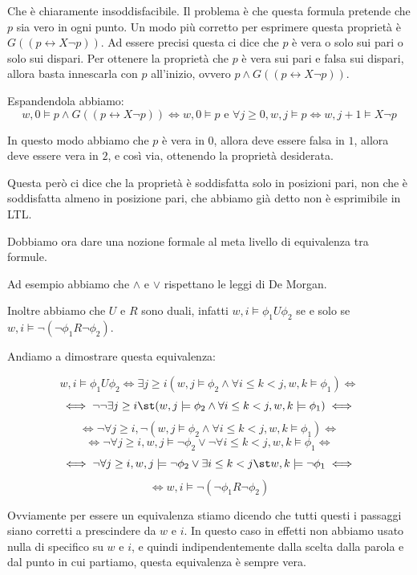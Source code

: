 Che è chiaramente insoddisfacibile. Il problema è che questa formula pretende che \(p\) sia vero in ogni punto.
Un modo più corretto per esprimere questa proprietà è \(G((p \leftrightarrow X \neg p) )\). Ad essere precisi questa ci dice che \(p\) è vera o solo sui pari o solo sui dispari. Per ottenere la proprietà che \(p\) è vera sui pari e falsa sui dispari, allora basta innescarla con \(p\) all'inizio, ovvero \(p \land G((p \leftrightarrow X \neg p) )\).

Espandendola abbiamo:
\[w,0 \models p \land G((p \leftrightarrow X \neg p) )\iff w,0 \models p \text{ e } \forall j \geq 0, w,j \models p \iff w,j+1 \models X \neg p\]

In questo modo abbiamo che \(p\) è vera in \(0\), allora deve essere falsa in \(1\), allora deve essere vera in \(2\), e così via, ottenendo la proprietà desiderata.

Questa però ci dice che la proprietà è soddisfatta solo in posizioni pari, non che è soddisfatta almeno in posizione pari, che abbiamo già detto non è esprimibile in LTL\@.

Dobbiamo ora dare una nozione formale al meta livello di equivalenza tra formule.

Ad esempio abbiamo che \(\land\) e \(\lor\) rispettano le leggi di De Morgan.

Inoltre abbiamo che \(U\) e \(R\) sono duali, infatti \(w,i \models \phi_1 U \phi_2\) se e solo se \(w,i \models \neg (\neg \phi_1 R \neg \phi_2)\).

Andiamo a dimostrare questa equivalenza:

\[w,i\models \phi_1 U \phi_2 \iff \exists j \geq i( w,j \models \phi_2 \land \forall i\leq k < j, w,k\models \phi_1)\iff\]
\[\iff \neg \neg \exists j \geq i\st( w,j \models \phi_2 \land \forall i\leq k < j, w,k\models \phi_1) \iff\]
\[\iff \neg \forall j \geq i,\neg( w,j \models \phi_2 \land \forall i\leq k < j, w,k\models \phi_1) \iff\]
\[\iff \neg \forall j \geq i, w,j \models \neg \phi_2 \lor \neg \forall i\leq k < j, w,k\models \phi_1 \iff\]
\[\iff \neg \forall j \geq i, w,j \models \neg \phi_2 \lor \exists i \leq k < j\st w,k\models \neg \phi_1 \iff\]
\[\iff w,i \models \neg (\neg \phi_1 R \neg \phi_2)\]

Ovviamente per essere un equivalenza stiamo dicendo che tutti questi i passaggi siano corretti a prescindere da \(w\) e \(i\).
In questo caso in effetti non abbiamo usato nulla di specifico su \(w\) e \(i\), e quindi indipendentemente dalla scelta dalla parola e dal punto in cui partiamo, questa equivalenza è sempre vera.

